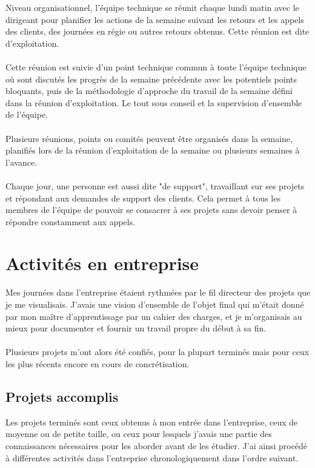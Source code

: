 \begin{sloppypar}
Niveau organisationnel, l'équipe technique se réunit chaque lundi matin avec le dirigeant pour planifier les actions de la semaine suivant les retours et les appels des clients, des journées en régie ou autres retours obtenus. Cette réunion est dite d'exploitation.
\\ \\
Cette réunion est suivie d'un point technique commun à toute l'équipe technique où sont discutés les progrès de la semaine précédente avec les potentiels points bloquants, puis de la méthodologie d'approche du travail de la semaine défini dans la réunion d'exploitation. Le tout sous conseil et la supervision d'ensemble de l'équipe.
\\ \\
Plusieurs réunions, points ou comités peuvent être organisés dans la semaine, planifiés lors de la réunion d'exploitation de la semaine ou plusieurs semaines à l'avance.
\\ \\
Chaque jour, une personne est aussi dite "de support", travaillant sur ses projets et répondant aux demandes de support des clients. Cela permet à tous les membres de l'équipe de pouvoir se consacrer à ses projets sans devoir penser à répondre constamment aux appels.

\newpage

\section{Activités en entreprise}

Mes journées dans l'entreprise étaient rythmées par le fil directeur des projets que je me visualisais. J'avais une vision d'ensemble de l'objet final qui m'était donné par mon maître d'apprentissage par un cahier des charges, et je m'organisais au mieux pour documenter et fournir un travail propre du début à sa fin.
\\ \\
Plusieurs projets m'ont alors été confiés, pour la plupart terminés mais pour ceux les plus récents encore en cours de concrétisation.

\subsection{Projets accomplis}

Les projets terminés sont ceux obtenus à mon entrée dans l'entreprise, ceux de moyenne ou de petite taille, ou ceux pour lesquels j'avais une partie des connaissances nécessaires pour les aborder avant de les étudier. J'ai ainsi procédé à différentes activités dans l'entreprise chronologiquement dans l'ordre suivant.


\end{sloppypar}

